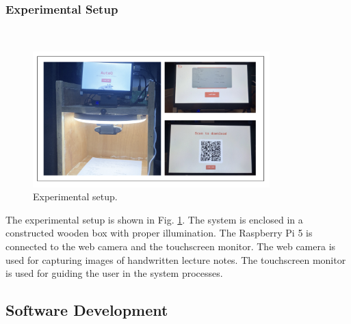 \documentclass[conference]{IEEEtran}
\begin{document}
        \subsubsection{Experimental Setup}
            \hfill \\
            \vspace{-0.6cm}
            \begin{figure}[H]
                \centerline{\includegraphics[width=3.6in]{experimental.png}}
                \vspace{-0.3cm}
                \caption{Experimental setup.} 
                \label{experimental}
            \end{figure} 
            \vspace{-0.3cm}
            \indent The experimental setup is shown in 
            Fig. \ref{experimental}. The system is enclosed in a
            constructed wooden box with proper illumination. The
            Raspberry Pi 5 is connected to the web camera and the
            touchscreen monitor. The web camera is used for capturing
            images of handwritten lecture notes. The touchscreen
            monitor is used for guiding the user in the system
            processes.
    \subsection{Software Development}
\end{document}
